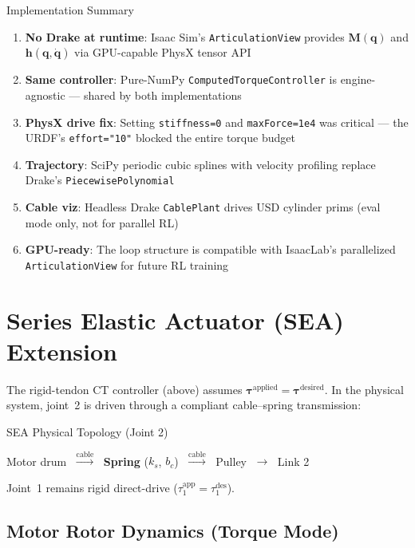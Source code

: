 \documentclass[11pt,a4paper]{article}
\newcommand{\bq}{\bm{q}}
\newcommand{\bdq}{\dot{\bm{q}}}
\newcommand{\btau}{\bm{\tau}}
\newcommand{\bM}{\bm{M}}
\newcommand{\bh}{\bm{h}}
\begin{document}
\begin{archbox}{Implementation Summary}
\begin{enumerate}[leftmargin=2em]
    \item \textbf{No Drake at runtime}: Isaac Sim's \texttt{ArticulationView} provides $\bM(\bq)$ and $\bh(\bq,\bdq)$ via GPU-capable PhysX tensor API
    \item \textbf{Same controller}: Pure-NumPy \texttt{ComputedTorqueController} is engine-agnostic --- shared by both implementations
    \item \textbf{PhysX drive fix}: Setting \texttt{stiffness=0} and \texttt{maxForce=1e4} was critical --- the URDF's \texttt{effort="10"} blocked the entire torque budget
    \item \textbf{Trajectory}: SciPy periodic cubic splines with velocity profiling replace Drake's \texttt{PiecewisePolynomial}
    \item \textbf{Cable viz}: Headless Drake \texttt{CablePlant} drives USD cylinder prims (eval mode only, not for parallel RL)
    \item \textbf{GPU-ready}: The loop structure is compatible with IsaacLab's parallelized \texttt{ArticulationView} for future RL training
\end{enumerate}
\end{archbox}


\section{Series Elastic Actuator (SEA) Extension}
\label{sec:sea}

The rigid-tendon CT controller (above) assumes $\btau^{\text{applied}} = \btau^{\text{desired}}$.
In the physical system, joint~2 is driven through a compliant cable--spring transmission:

\begin{archbox}{SEA Physical Topology (Joint 2)}
\begin{center}
Motor drum $\;\xrightarrow{\text{cable}}\;$
\textbf{Spring} ($k_s$, $b_c$) $\;\xrightarrow{\text{cable}}\;$
Pulley $\;\to\;$ Link 2
\end{center}
Joint~1 remains rigid direct-drive ($\tau_1^{\text{app}} = \tau_1^{\text{des}}$).
\end{archbox}

\subsection{Motor Rotor Dynamics (Torque Mode)}
\end{document}
